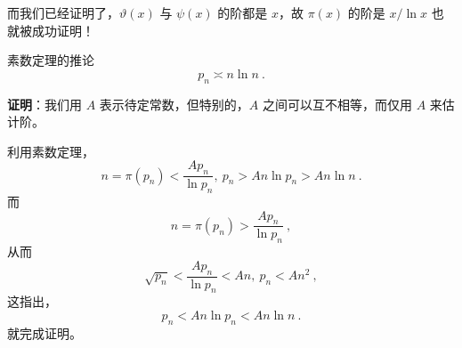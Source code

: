 而我们已经证明了，$\vartheta(x)$ 与 $\psi(x)$ 的阶都是 $x$，故 $\pi(x)$ 的阶是 $x/\ln x$ 也就被成功证明！

\begin{corollary}{素数定理的推论}
\begin{equation}
p_n \asymp n \ln n ~.
\end{equation}
\end{corollary}
\textbf{证明}：我们用 $A$ 表示待定常数，但特别的，$A$ 之间可以互不相等，而仅用 $A$ 来估计阶。

利用素数定理，
\begin{equation}
n = \pi(p_n) < \frac{A p_n}{\ln p_n}, ~ p_n > An\ln p_n > An \ln n ~.
\end{equation}
而
\begin{equation}
n = \pi(p_n) > \frac{Ap_n}{\ln p_n} ~,
\end{equation}
从而
\begin{equation}
\sqrt{p_n} < \frac{A p_n}{\ln p_n} < A n, ~ p_n < A n^2 ~,
\end{equation}
这指出，
\begin{equation}
p_n < A n \ln p_n < An \ln n ~.
\end{equation}
就完成证明。


